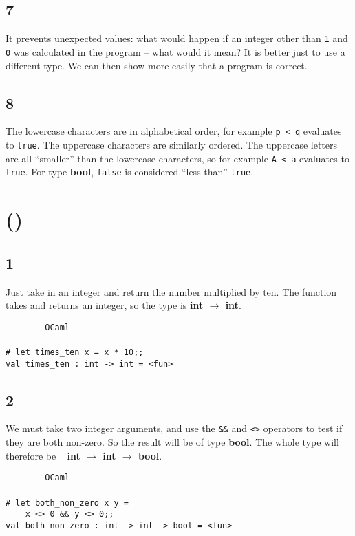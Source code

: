 \documentclass[]{book}
\newcommand\upquote[1]{\textquotesingle#1\textquotesingle}
\newcommand{\smspace}{\vspace{4mm}}
\begin{document}
\subsection*{7}
It prevents unexpected values: what would happen if an integer other than \texttt{1} and \texttt{0} was calculated in the program -- what would it mean? It is better just to use a different type. We can then show more easily that a program is correct.

\subsection*{8}

The lowercase characters are in alphabetical order, for example \texttt{\upquote{p}\! <\! \upquote{q}} evaluates to \texttt{true}. The uppercase characters are similarly ordered. The uppercase letters are all ``smaller'' than the lowercase characters, so for example \texttt{\upquote{A}\! <\! \upquote{a}} evaluates to \texttt{true}. For type \textsf{\textbf{bool}}, \texttt{false} is considered ``less than'' \texttt{true}.

\section*{ ()}
\subsection*{1}
Just take in an integer and return the number multiplied by ten. The function takes and returns an integer, so the type is \textbf{\textsf{int $\rightarrow$ int}}.

\smspace
\noindent\verb!        OCaml!\\
\noindent\\
\noindent\verb!# let times_ten x = x * 10;;!\\
\noindent\verb!val times_ten : int -> int = <fun>!

\subsection*{2}
We must take two integer arguments, and use the \texttt{\&\&} and \texttt{<>} operators to test if they are both non-zero. So the result will be of type \textsf{\textbf{bool}}. The whole type will therefore be \ \!\! \textbf{\textsf{int $\rightarrow$ int $\rightarrow$ bool}}.

\smspace
\noindent\verb!        OCaml!\\
\noindent\\
\noindent\verb!# let both_non_zero x y =!\\
\noindent\verb!    x <> 0 && y <> 0;;!\\
\noindent\verb!val both_non_zero : int -> int -> bool = <fun>!
\end{document}
